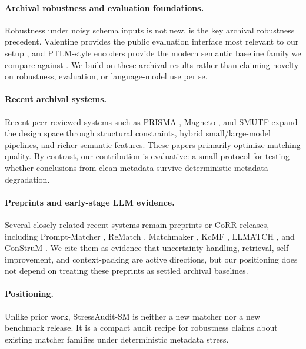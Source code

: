 \documentclass{article}
\newcommand{\stressaudit}{StressAudit-SM}
\begin{document}
\paragraph{Archival robustness and evaluation foundations.}
Robustness under noisy schema inputs is not new. \citet{he2005holistic} is the key archival robustness precedent. Valentine provides the public evaluation interface most relevant to our setup \citep{koutras2021valentine}, and PTLM-style encoders provide the modern semantic baseline family we compare against \citep{zhang2023schema}. We build on these archival results rather than claiming novelty on robustness, evaluation, or language-model use per se.

\paragraph{Recent archival systems.}
Recent peer-reviewed systems such as PRISMA \citep{hellenberg2025prisma}, Magneto \citep{liu2025magneto}, and SMUTF \citep{zhang2025smutf} expand the design space through structural constraints, hybrid small/large-model pipelines, and richer semantic features. These papers primarily optimize matching quality. By contrast, our contribution is evaluative: a small protocol for testing whether conclusions from clean metadata survive deterministic metadata degradation.

\paragraph{Preprints and early-stage LLM evidence.}
Several closely related recent systems remain preprints or CoRR releases, including Prompt-Matcher \citep{feng2024promptmatcher}, ReMatch \citep{sheetrit2024rematch}, Matchmaker \citep{seedat2024matchmaker}, KcMF \citep{xu2024kcmf}, LLMATCH \citep{wang2025llmatch}, and ConStruM \citep{chen2026construm}. We cite them as evidence that uncertainty handling, retrieval, self-improvement, and context-packing are active directions, but our positioning does not depend on treating these preprints as settled archival baselines.

\paragraph{Positioning.}
Unlike prior work, \stressaudit{} is neither a new matcher nor a new benchmark release. It is a compact audit recipe for robustness claims about existing matcher families under deterministic metadata stress.
\end{document}
